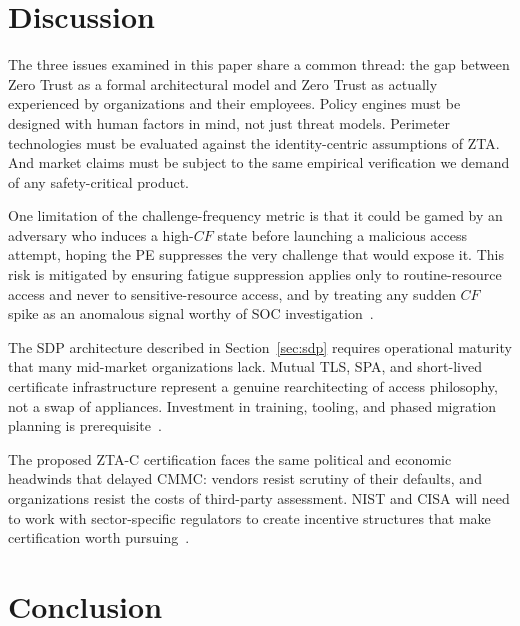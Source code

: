 \documentclass[sigconf,nonacm]{acmart}
\begin{document}
\section{Discussion}
\label{sec:discussion}

The three issues examined in this paper share a common thread: the gap between
Zero Trust as a formal architectural model and Zero Trust as actually experienced
by organizations and their employees. Policy engines must be designed with human
factors in mind, not just threat models. Perimeter technologies must be evaluated
against the identity-centric assumptions of ZTA. And market claims must be subject
to the same empirical verification we demand of any safety-critical product.

One limitation of the challenge-frequency metric is that it could be gamed by an
adversary who induces a high-$CF$ state before launching a malicious access
attempt, hoping the PE suppresses the very challenge that would expose it. This
risk is mitigated by ensuring fatigue suppression applies only to routine-resource
access and never to sensitive-resource access, and by treating any sudden $CF$
spike as an anomalous signal worthy of SOC investigation~\cite{mandiant_mfa_fatigue2023}.

The SDP architecture described in Section~\ref{sec:sdp} requires operational
maturity that many mid-market organizations lack. Mutual TLS, SPA, and short-lived
certificate infrastructure represent a genuine rearchitecting of access philosophy,
not a swap of appliances. Investment in training, tooling, and phased migration
planning is prerequisite~\cite{patel_sdp_zt2024}.

The proposed ZTA-C certification faces the same political and economic headwinds
that delayed CMMC: vendors resist scrutiny of their defaults, and organizations
resist the costs of third-party assessment. NIST and CISA will need to work with
sector-specific regulators to create incentive structures that make certification
worth pursuing~\cite{cmmc_dod2023,cisa_zt_strategy2022}.

\section{Conclusion}
\label{sec:conclusion}
\end{document}
